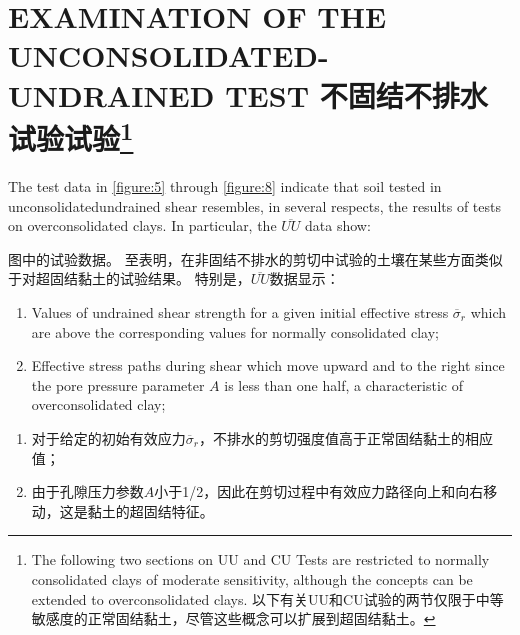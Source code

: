 \section{EXAMINATION OF THE UNCONSOLIDATED-UNDRAINED TEST 不固结不排水试验试验\protect\footnote[6]{
    The following two sections on UU and CU Tests are restricted to normally consolidated clays of moderate sensitivity, although the concepts can be extended to overconsolidated clays. 以下有关UU和CU试验的两节仅限于中等敏感度的正常固结黏土，尽管这些概念可以扩展到超固结黏土。
}}

\begin{paracol}{2}
    
    The test data in \autoref{figure:5} through \autoref{figure:8} indicate that soil tested in unconsolidatedundrained shear resembles, in several respects, the results of tests on overconsolidated clays. In particular, the $\overline{UU}$ data show: 

    \switchcolumn

    图中的试验数据。 至表明，在非固结不排水的剪切中试验的土壤在某些方面类似于对超固结黏土的试验结果。 特别是，$\overline{UU}$数据显示：

    \switchcolumn*

    \begin{enumerate}
        \item Values of undrained shear strength for a given initial effective stress $\overline{\sigma}_r$ which are above the corresponding values for normally consolidated clay; 
        \item Effective stress paths during shear which move upward and to the right since the pore pressure parameter $A$ is less than one half, a characteristic of overconsolidated clay;
    \end{enumerate}

    \switchcolumn
    
    \begin{enumerate}
        \item 对于给定的初始有效应力$\overline{\sigma}_r$，不排水的剪切强度值高于正常固结黏土的相应值； 
        \item 由于孔隙压力参数$A$小于1/2，因此在剪切过程中有效应力路径向上和向右移动，这是黏土的超固结特征。 
    \end{enumerate}

    \switchcolumn*
    

\end{paracol}
